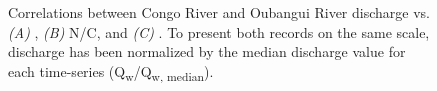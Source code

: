 \begin{figure}[p]
	\caption[Discharge vs. , N/C, and ]{Correlations between Congo River and Oubangui River discharge vs. \textit{(A)} , \textit{(B)} N/C, and \textit{(C)} . To present both records on the same scale, discharge has been normalized by the median discharge value for each time-series (Q\textsubscript{w}/Q\textsubscript{w, median}).}
	\label{Ch5Fig:6} 
\end{figure}

